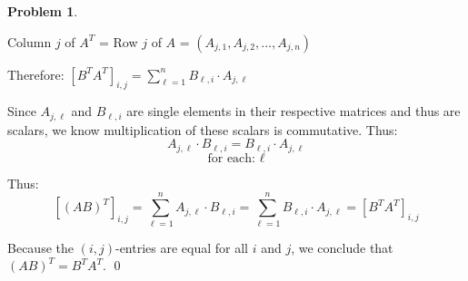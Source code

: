 \documentclass[12pt, oneside]{amsart}
\theoremstyle{definition}
\newtheorem{prob}{Problem}
\begin{document}
\begin{prob}
\begin{enumerate}
\begin{solution}
    \hspace{2em} Column $j$ of $A^T$ = Row $j$ of $A$ = $(A_{j,1}, A_{j,2}, \ldots, A_{j,n})$

    
    Therefore:
    $[B^T A^T]_{i,j} = \sum_{\ell=1}^{n} B_{\ell,i} \cdot A_{j,\ell}$
    
    \vspace{0.3cm}

    Since $A_{j,\ell}$ and $B_{\ell,i}$ are single elements in their respective matrices and thus are scalars, we know multiplication of these scalars is commutative. Thus:
    \[
      A_{j,\ell} \cdot B_{\ell,i} = B_{\ell,i} \cdot A_{j,\ell}
    \]
    \[
    \text{for each: } \ell
    \]
    
    Thus:
    \[
    [(AB)^T]_{i,j} = \sum_{\ell=1}^{n} A_{j,\ell} \cdot B_{\ell,i} = \sum_{\ell=1}^{n} B_{\ell,i} \cdot A_{j,\ell} = [B^T A^T]_{i,j}
    \]
    
    
    Because the $(i,j)$-entries are equal for all $i$ and $j$, we conclude that $(AB)^T = B^T A^T$. \qed
    \end{solution}

    \end{enumerate}

\end{prob}
\end{document}
